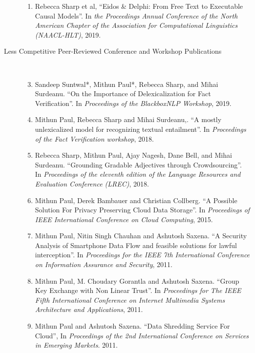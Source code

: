 \documentclass[10pt]{article}
\newcommand{\ve}[1]{{\em #1}} %
\newcommand{\ti}[1]{``#1''} %
\begin{document}
\begin{description}
\begin{enumerate}
\item  Rebecca Sharp et al,   \ti{Eidos \& Delphi: From Free Text to Executable Causal Models}. In \ve{ the Proceedings Annual Conference of the North American Chapter of the Association for Computational Linguistics (NAACL-HLT)}, 2019.

\end{enumerate}

\item [Less Competitive Peer-Reviewed Conference and Workshop Publications]\

\begin{enumerate}
\setcounter{enumi}{2}


\item Sandeep Suntwal*, Mithun Paul*, Rebecca Sharp, and Mihai Surdeanu.   \ti{On the Importance of Delexicalization for Fact Verification}. In \ve{Proceedings of the BlackboxNLP Workshop}, 2019.

\item Mithun Paul, Rebecca Sharp and Mihai Surdeanu,.   \ti{A mostly unlexicalized model for recognizing textual entailment}. In \ve{Proceedings of the Fact Verification workshop}, 2018.

\item Rebecca Sharp, Mithun Paul, Ajay Nagesh, Dane  Bell, and Mihai Surdeanu.   \ti{Grounding Gradable Adjectives through Crowdsourcing}. In \ve{Proceedings of the eleventh edition of the Language Resources and Evaluation Conference (LREC)}, 2018.

\item Mithun Paul, Derek Bambauer and Christian Collberg.   \ti{A Possible Solution For Privacy Preserving Cloud Data Storage}. In \ve{Proceedings of IEEE International Conference on Cloud Computing}, 2015.

\item  Mithun Paul, Nitin Singh Chauhan and Ashutosh Saxena.   \ti{A Security Analysis of Smartphone Data Flow and feasible solutions for lawful interception}. In \ve{ Proceedings for the IEEE 7th International Conference on Information Assurance and Security}, 2011.

\item  Mithun Paul, M. Choudary Gorantla and Ashutosh Saxena.   \ti{Group Key Exchange with Non Linear Trust}. In \ve{ Proceedings for The IEEE Fifth International Conference on Internet Multimedia Systems Architecture and Applications}, 2011.

\item  Mithun Paul and Ashutosh Saxena.   \ti{Data Shredding Service For Cloud}, In \ve{  Proceedings of the 2nd International Conference on Services in Emerging Markets}. 2011.


\end{enumerate}
\end{description}
\end{document}
